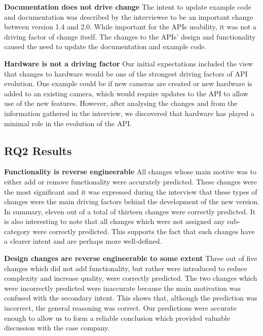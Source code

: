 \documentclass{sig-alternate}
\begin{document}
\smallskip \noindent
\textbf{Documentation does not drive change  } %
The intent to update example code and documentation was described by the interviewee to be an important change between version 1.4 and 2.0. While important for the APIs usability, it was not a driving factor of change itself. The changes to the APIs' design and functionality caused the need to update the documentation and example code.

\smallskip \noindent
\textbf{Hardware is not a driving factor  } %
Our initial expectations included the view that changes to hardware would be one of the strongest driving factors of API evolution. One example could be if new cameras are created or new hardware is added to an existing camera, which would require updates to the API to allow use of the new features. However, after analysing the changes and from the information gathered in the interview, we discovered that hardware has played a minimal role in the evolution of the API. 

\subsection{RQ2 Results}






\noindent
\textbf{Functionality is reverse engineerable  } %
All changes whose main motive was to either add or remove functionality were accurately predicted. These changes were the most significant and it was expressed during the interview that these types of changes were the main driving factors behind the development of the new version. In summary, eleven out of a total of thirteen changes were correctly predicted. It is also interesting to note that all changes which were not assigned any sub-category were correctly predicted. This supports the fact that such changes have a clearer intent and are perhaps more well-defined.

\smallskip \noindent
\textbf{Design changes are reverse engineerable to some extent  }  %
Three out of five changes which did not add functionality, but rather were introduced to reduce complexity and increase quality, were correctly predicted. The two changes which were incorrectly predicted were inaccurate because the main motivation was confused with the secondary intent. This shows that, although the prediction was incorrect, the general reasoning was correct. Our predictions were accurate enough to allow us to form a reliable conclusion which provided valuable discussion with the case company. 
\end{document}
